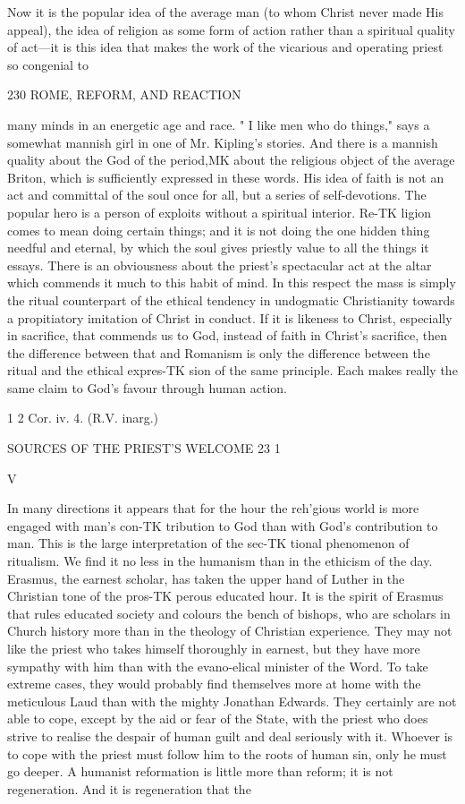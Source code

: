 \documentclass[12pt,a5paper,oneside]{book}
\begin{document}
{{Now it is the popular idea of the average man (to 
whom Christ never made His appeal), the idea of 
religion as some form of action rather than a spiritual 
quality of act---it is this idea that makes the work of 
the vicarious and operating priest so congenial to 



230 ROME, REFORM, AND REACTION 

many minds in an energetic age and race. " I like 
men who do things," says a somewhat mannish girl 
in one of Mr. Kipling's stories. And there is a 
mannish quality about the God of the period,MK about 
the religious object of the average Briton, which is 
sufficiently expressed in these words. His idea of 
faith is not an act and committal of the soul once for 
all, but a series of self-devotions. The popular hero is 
a person of exploits without a spiritual interior. Re-TK
ligion comes to mean doing certain things; and it is 
not doing the one hidden thing needful and eternal, by 
which the soul gives priestly value to all the things 
it essays. There is an obviousness about the priest's 
spectacular act at the altar which commends it much 
to this habit of mind. In this respect the mass is 
simply the ritual counterpart of the ethical tendency 
in undogmatic Christianity towards a propitiatory 
imitation of Christ in conduct. If it is likeness to 
Christ, especially in sacrifice, that commends us to 
God, instead of faith in Christ's sacrifice, then the 
difference between that and Romanism is only the 
difference between the ritual and the ethical expres-TK
sion of the same principle. Each makes really the 
same claim to God's favour through human action. 

1 2 Cor. iv. 4. (R.V. inarg.) 



SOURCES OF THE PRIEST'S WELCOME 23 1 

V 

In many directions it appears that for the hour 
the reh'gious world is more engaged with man's con-TK
tribution to God than with God's contribution to 
man. This is the large interpretation of the sec-TK
tional phenomenon of ritualism. We find it no less 
in the humanism than in the ethicism of the day. 
Erasmus, the earnest scholar, has taken the upper 
hand of Luther in the Christian tone of the pros-TK
perous educated hour. It is the spirit of Erasmus 
that rules educated society and colours the bench of 
bishops, who are scholars in Church history more than 
in the theology of Christian experience. They may 
not like the priest who takes himself thoroughly in 
earnest, but they have more sympathy with him than 
with the evano-elical minister of the Word. To take 
extreme cases, they would probably find themselves 
more at home with the meticulous Laud than with 
the mighty Jonathan Edwards. They certainly are 
not able to cope, except by the aid or fear of the State, 
with the priest who does strive to realise the despair 
of human guilt and deal seriously with it. Whoever 
is to cope with the priest must follow him to the 
roots of human sin, only he must go deeper. A 
humanist reformation is little more than reform; it 
is not regeneration. And it is regeneration that the 



}}
\end{document}
